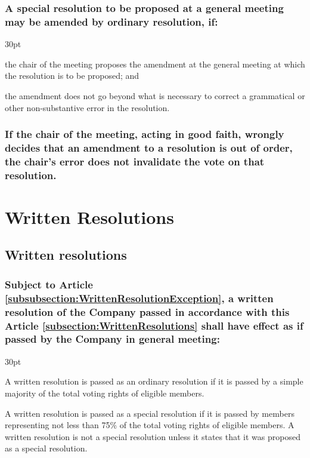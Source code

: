 \documentclass[12pt]{article}
\def\clauseindent{30pt}
\newenvironment{subindentpara}{\begin{adjustwidth}{\clauseindent}{}\begin{hanginglist}}{\end{hanginglist}\end{adjustwidth}}
\begin{document}
\subsubsection{A special resolution to be proposed at a general meeting may be amended by ordinary resolution, if:}
\begin{subindentpara}
    \item the chair of the meeting proposes the amendment at the general meeting at which the resolution is to be proposed; and
    \item the amendment does not go beyond what is necessary to correct a grammatical or other non-substantive error in the resolution.
\end{subindentpara}
\subsubsection{If the chair of the meeting, acting in good faith, wrongly decides that an amendment to a resolution is out of order, the chair’s error does not invalidate the vote on that resolution.}

\section*{Written Resolutions}
\subsection{\label{subsection:WrittenResolutions}Written resolutions}
\subsubsection{Subject to Article \ref{subsubsection:WrittenResolutionException}, a written resolution of the Company passed in accordance with this Article \ref{subsection:WrittenResolutions} shall have effect as if passed by the Company in general meeting:}
\begin{subindentpara}
    \item A written resolution is passed as an ordinary resolution if it is passed by a simple majority of the total voting rights of eligible members.
    \item A written resolution is passed as a special resolution if it is passed by members representing not less than 75\% of the total voting rights of eligible members. A written resolution is not a special resolution unless it states that it was proposed as a special resolution.
\end{subindentpara}
\end{document}
